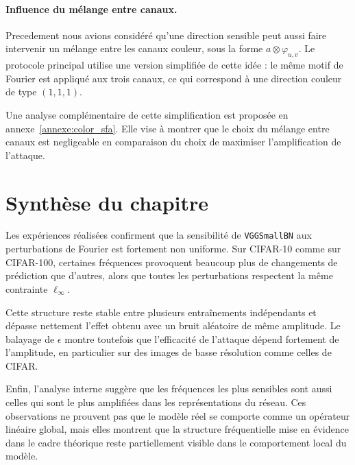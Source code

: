 \paragraph{Influence du mélange entre canaux.}

Precedement nous avions considéré qu'une direction sensible peut aussi faire intervenir un mélange entre
les canaux couleur, sous la forme $a \otimes \varphi_{u,v}$. Le protocole principal utilise une version simplifiée de
cette idée : le même motif de Fourier est appliqué aux trois canaux, ce qui correspond à une direction
couleur de type $(1,1,1)$.

Une analyse complémentaire de cette simplification est proposée en annexe~\ref{annexe:color_sfa}.
Elle vise à montrer que le choix du mélange entre canaux est negligeable en comparaison du choix de maximiser l'amplification de l'attaque.

\section{Synthèse du chapitre}
\label{sec:synthese_chapitre4}

Les expériences réalisées confirment que la sensibilité de \texttt{VGGSmallBN} aux perturbations de
Fourier est fortement non uniforme. Sur CIFAR-10 comme sur CIFAR-100, certaines fréquences
provoquent beaucoup plus de changements de prédiction que d'autres, alors que toutes les perturbations
respectent la même contrainte $\ell_\infty$.

Cette structure reste stable entre plusieurs entraînements indépendants et dépasse nettement l'effet
obtenu avec un bruit aléatoire de même amplitude. Le balayage de $\epsilon$ montre toutefois que
l'efficacité de l'attaque dépend fortement de l'amplitude, en particulier sur des images de basse
résolution comme celles de CIFAR.

Enfin, l'analyse interne suggère que les fréquences les plus sensibles sont aussi celles qui sont le plus
amplifiées dans les représentations du réseau. Ces observations ne prouvent pas que le modèle réel se
comporte comme un opérateur linéaire global, mais elles montrent que la structure fréquentielle mise
en évidence dans le cadre théorique reste partiellement visible dans le comportement local du modèle.
